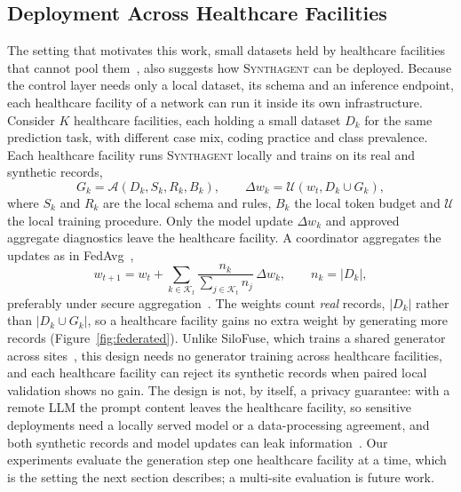 \documentclass[conference]{IEEEtran}
\newcommand{\system}{\textsc{Synthagent}\xspace}
\begin{document}
\subsection{Deployment Across Healthcare Facilities}
\label{sec:deployment}
The setting that motivates this work, small datasets held by healthcare facilities that cannot pool them~\cite{rieke2020digitalhealth,sheller2020medicine}, also suggests how \system can be deployed. Because the control layer needs only a local dataset, its schema and an inference endpoint, each healthcare facility of a network can run it inside its own infrastructure. Consider $K$ healthcare facilities, each holding a small dataset $D_k$ for the same prediction task, with different case mix, coding practice and class prevalence. Each healthcare facility runs \system locally and trains on its real and synthetic records,
\begin{equation}
G_k=\mathcal{A}(D_k,S_k,R_k,B_k),\qquad
\Delta w_k=\mathcal{U}(w_t,D_k\cup G_k),
\label{eq:local-federated}
\end{equation}
where $S_k$ and $R_k$ are the local schema and rules, $B_k$ the local token budget and $\mathcal{U}$ the local training procedure. Only the model update $\Delta w_k$ and approved aggregate diagnostics leave the healthcare facility. A coordinator aggregates the updates as in FedAvg~\cite{mcmahan2017fedavg,kairouz2021federated},
\begin{equation}
w_{t+1}=w_t+\sum_{k\in\mathcal{K}_t}\frac{n_k}{\sum_{j\in\mathcal{K}_t}n_j}\,\Delta w_k,\qquad n_k=|D_k|,
\label{eq:federated-aggregate}
\end{equation}
preferably under secure aggregation~\cite{bonawitz2017secure}. The weights count \emph{real} records, $|D_k|$ rather than $|D_k\cup G_k|$, so a healthcare facility gains no extra weight by generating more records (Figure~\ref{fig:federated}). Unlike SiloFuse, which trains a shared generator across sites~\cite{shankar2024silofuse}, this design needs no generator training across healthcare facilities, and each healthcare facility can reject its synthetic records when paired local validation shows no gain. The design is not, by itself, a privacy guarantee: with a remote LLM the prompt content leaves the healthcare facility, so sensitive deployments need a locally served model or a data-processing agreement, and both synthetic records and model updates can leak information~\cite{chen2024modeltrip}. Our experiments evaluate the generation step one healthcare facility at a time, which is the setting the next section describes; a multi-site evaluation is future work.
\end{document}
